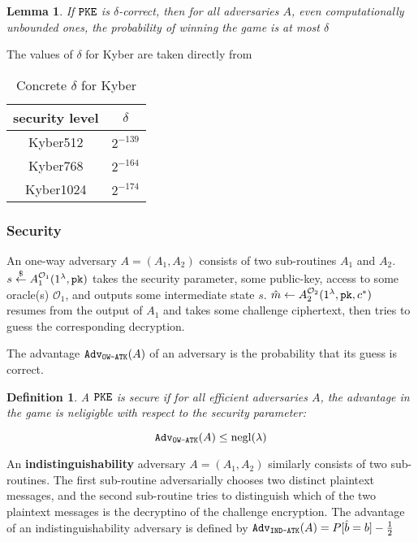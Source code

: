\documentclass{article}
\newtheorem{definition}{Definition}[section]
\newtheorem{lemma}{Lemma}[theorem]
\begin{document}
\begin{lemma}
    If $\texttt{PKE}$ is $\delta$-correct, then for all  adversaries $A$, even computationally unbounded ones, the probability of winning the  game is at most $\delta$
\end{lemma}

The values of $\delta$ for Kyber are taken directly from \cite{avanzi2019crystals}

\begin{table}[H]
    \center
    \begin{tabular}{c|c}
        security level & $\delta$ \\
        \hline
        Kyber512 & $2^{-139}$ \\
        \hline
        Kyber768 & $2^{-164}$ \\
        \hline
        Kyber1024 & $2^{-174}$ \\
    \end{tabular}
    \caption{Concrete $\delta$ for Kyber}\label{tbl:kyber-delta-vals}
\end{table}

\subsubsection{Security}
An one-way adversary $A = (A_1, A_2)$ consists of two sub-routines $A_1$ and $A_2$. $s \stackrel{\$}{\leftarrow} A_1^{\mathcal{O}_1}(1^\lambda, \texttt{pk})$ takes the security parameter, some public-key, access to some oracle(s) $\mathcal{O}_1$, and outputs some intermediate state $s$. $\hat{m} \leftarrow A_2^{\mathcal{O}_2}(1^\lambda, \texttt{pk}, c^\ast)$ resumes from the output of $A_1$ and takes some challenge ciphertext, then tries to guess the corresponding decryption.

The advantage $\texttt{Adv}_\texttt{OW-ATK}(A)$ of an  adversary is the probability that its guess is correct.

\begin{definition}
    A $\texttt{PKE}$ is  secure if for all efficient adversaries $A$, the advantage in the  game is neligigble with respect to the security parameter:

    \begin{equation*}
        \texttt{Adv}_\texttt{OW-ATK}(A) \leq \operatorname{negl}(\lambda)
    \end{equation*}
\end{definition}

An \textbf{indistinguishability} adversary $A = (A_1, A_2)$ similarly consists of two sub-routines. The first sub-routine adversarially chooses two distinct plaintext messages, and the second sub-routine tries to distinguish which of the two plaintext messages is the decryptino of the challenge encryption. The advantage of an indistinguishability adversary is defined by $\texttt{Adv}_\texttt{IND-ATK}(A) = P[\hat{b} = b] - \frac{1}{2}$
\end{document}
